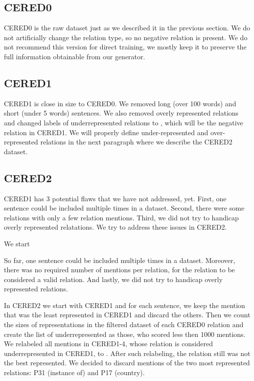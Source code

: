 \subsection{CERED0}
CERED0 is the raw dataset just as we described it in the previous section. We do not artificially change the relation type, so no negative relation is present. We do not recommend this version for direct training, we mostly keep it to preserve the full information obtainable from our generator.

\subsection{CERED1}
CERED1 is close in size to CERED0. We removed long (over 100 words) and short (under 5 words) sentences. We also removed overly represented relations and changed labels of underrepresented relations to , which will be the negative relation in CERED1. We will properly define under-represented and over-represented relations in the next paragraph where we describe the CERED2 dataset.

\subsection{CERED2}

CERED1 has 3 potential flaws that we have not addressed, yet. First, one sentence could be included multiple times in a dataset. Second, there were some relations with only a few relation mentions. Third, we did not try to handicap overly represented relatations. We try to address these issues in CERED2.

We start

So far, one sentence could be included multiple times in a dataset. Moreover, there was no required number of mentions per relation, for the relation to be considered a valid relation. And lastly, we did not try to handicap overly represented relations. 

In CERED2 we start with CERED1 and for each sentence, we keep the mention that was the least represented in CERED1 and discard the others. Then we count the sizes of representations in the filtered dataset of each CERED0 relation and create the list of underrepresented as those, who scored less then 1000 mentions. We relabeled all mentions in CERED1-4, whose relation is considered underrepresented in CERED1, to . After such relabeling, the  relation still was not the best represented. We decided to discard mentions of the two most represented relations: P31 (instance of) and P17 (country). 



